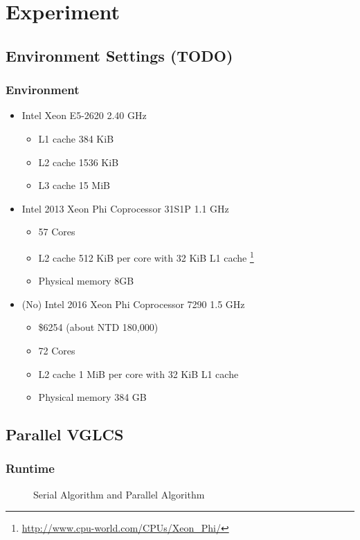 \section{Experiment}

\subsection{Environment Settings (TODO)}
\begin{frame}
    \frametitle{Environment}
    \begin{itemize}
    	\item Intel Xeon E5-2620 2.40 GHz
    		\begin{itemize}
    		 	\item L1 cache 384 KiB
    		 	\item L2 cache 1536 KiB
    		 	\item L3 cache 15 MiB
    		 \end{itemize}
    	\item Intel 2013 Xeon Phi Coprocessor 31S1P 1.1 GHz
    		\begin{itemize}
    			\item 57 Cores
    			\item L2 cache 512 KiB per core with 32 KiB L1 cache
    			\footnote{\url{http://www.cpu-world.com/CPUs/Xeon_Phi/}}
    			\item Physical memory 8GB
    		\end{itemize}
    	\item (No) Intel 2016 Xeon Phi Coprocessor 7290 1.5 GHz
    		\begin{itemize}
    			\item \$6254 (about NTD 180,000)
    			\item 72 Cores
    			\item L2 cache 1 MiB per core with 32 KiB L1 cache
    			\item Physical memory 384 GB
    		\end{itemize}
    \end{itemize}
\end{frame}

\subsection{Parallel VGLCS}
\begin{frame}
	\frametitle{Runtime}
	\begin{figure}[!ht]
		\centering
		\subfigure[Runtime]{
			
			\label{fig:fig-parallel}
		}
		\caption{Serial Algorithm and Parallel Algorithm}
		\label{fig:light_weight}
	\end{figure}
\end{frame}

